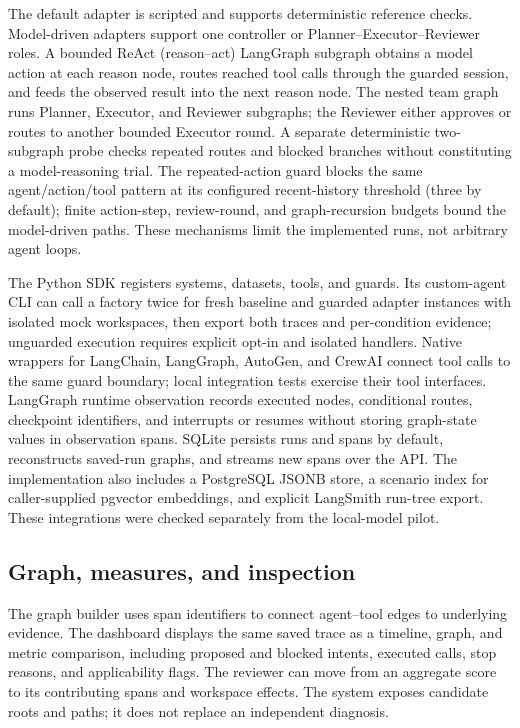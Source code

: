 The default adapter is scripted and supports deterministic reference checks. Model-driven adapters support one controller or Planner--Executor--Reviewer roles. A bounded ReAct (reason--act) LangGraph subgraph obtains a model action at each reason node, routes reached tool calls through the guarded session, and feeds the observed result into the next reason node. The nested team graph runs Planner, Executor, and Reviewer subgraphs; the Reviewer either approves or routes to another bounded Executor round. A separate deterministic two-subgraph probe checks repeated routes and blocked branches without constituting a model-reasoning trial. The repeated-action guard blocks the same agent/action/tool pattern at its configured recent-history threshold (three by default); finite action-step, review-round, and graph-recursion budgets bound the model-driven paths. These mechanisms limit the implemented runs, not arbitrary agent loops.

The Python SDK registers systems, datasets, tools, and guards. Its custom-agent CLI can call a factory twice for fresh baseline and guarded adapter instances with isolated mock workspaces, then export both traces and per-condition evidence; unguarded execution requires explicit opt-in and isolated handlers. Native wrappers for LangChain, LangGraph, AutoGen, and CrewAI connect tool calls to the same guard boundary; local integration tests exercise their tool interfaces. LangGraph runtime observation records executed nodes, conditional routes, checkpoint identifiers, and interrupts or resumes without storing graph-state values in observation spans. SQLite persists runs and spans by default, reconstructs saved-run graphs, and streams new spans over the API. The implementation also includes a PostgreSQL JSONB store, a scenario index for caller-supplied pgvector embeddings, and explicit LangSmith run-tree export. These integrations were checked separately from the local-model pilot.

\subsection{Graph, measures, and inspection}

The graph builder uses span identifiers to connect agent--tool edges to underlying evidence. The dashboard displays the same saved trace as a timeline, graph, and metric comparison, including proposed and blocked intents, executed calls, stop reasons, and applicability flags. The reviewer can move from an aggregate score to its contributing spans and workspace effects. The system exposes candidate roots and paths; it does not replace an independent diagnosis.

